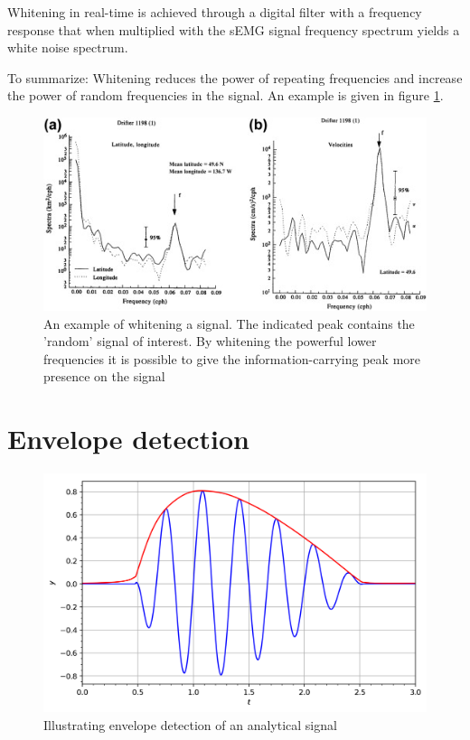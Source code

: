 Whitening in real-time is achieved through a digital filter with a frequency response that when multiplied with the sEMG signal frequency spectrum yields a white noise spectrum.

To summarize: Whitening reduces the power of repeating frequencies and increase the power of random frequencies in the signal. An example is given in figure \ref{fig:whitening_example}.

\begin{figure}[h!t]
	\begin{center}
		\includegraphics[width=1.0\columnwidth]{images/prewhitening_example.jpg}
	\end{center}
	\caption{An example of whitening a signal. The indicated peak contains the 'random' signal of interest. By whitening the powerful lower frequencies it is possible to give the information-carrying peak more presence on the signal \cite{time_series_analysis_methods}}
	\label{fig:whitening_example}
\end{figure}


\section{Envelope detection}

\begin{figure}[h!t]
	\begin{center}
		\includegraphics[width=0.7\columnwidth]{images/envelope_wikipedia.png}
	\end{center}
	\caption{Illustrating envelope detection of an analytical signal \cite{envelope_wikipedia}}
	\label{fig:envelope_wikipedia}
\end{figure}

